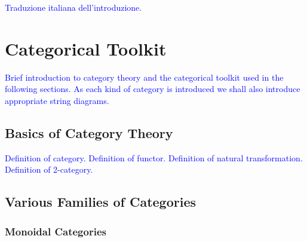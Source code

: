 \documentclass[12pt,a4paper,openright,twoside]{report}
\theoremstyle{plain}
\theoremstyle{definition}
\begin{document}
  \textcolor{blue}{Traduzione italiana dell'introduzione.}










\tableofcontents
\rhead[\fancyplain{}{\bfseries\leftmark}]{\fancyplain{}{\bfseries\thepage}} 

\listoffigures                         


\listoftables                           







\chapter{Categorical Toolkit}
\lhead[\fancyplain{}{\bfseries\thepage}]{\fancyplain{}{\bfseries\rightmark}}



\textcolor{blue}{Brief introduction to category theory and the categorical toolkit used in the following sections. As each kind of category is introduced we shall also introduce appropriate string diagrams.}



  \section{Basics of Category Theory}


  \textcolor{blue}{Definition of category.}
  \textcolor{blue}{Definition of functor.}
  \textcolor{blue}{Definition of natural transformation.}
  \textcolor{blue}{Definition of 2-category.}


  \section{Various Families of Categories}

  \subsection{Monoidal Categories}
\end{document}
